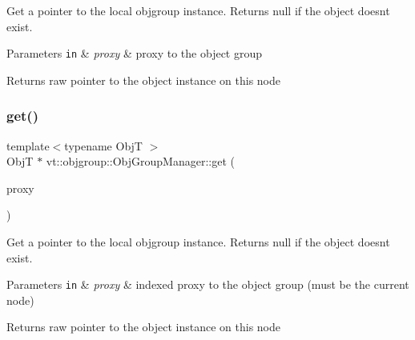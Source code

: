 Get a pointer to the local objgroup instance. Returns null if the object doesn\textquotesingle{}t exist. 


\begin{DoxyParams}[1]{Parameters}
\mbox{\tt in}  & {\em proxy} & proxy to the object group\\
\hline
\end{DoxyParams}
\begin{DoxyReturn}{Returns}
raw pointer to the object instance on this node 
\end{DoxyReturn}
\mbox{\label{structvt_1_1objgroup_1_1_obj_group_manager_a70e5e1d0ada31d6f88a8ec88965df895}} 
\subsubsection{\texorpdfstring{get()}{get()}\hspace{0.1cm}{\footnotesize\ttfamily [2/2]}}
{\footnotesize\ttfamily template$<$typename ObjT $>$ \\
ObjT $\ast$ vt\+::objgroup\+::\+Obj\+Group\+Manager\+::get (\begin{DoxyParamCaption}\item[{\hyperlink{structvt_1_1objgroup_1_1_obj_group_manager_adba6c8ecb0f4c30e719f1abb995cfc9b}{Proxy\+Elm\+Type}$<$ ObjT $>$}]{proxy }\end{DoxyParamCaption})}



Get a pointer to the local objgroup instance. Returns null if the object doesn\textquotesingle{}t exist. 


\begin{DoxyParams}[1]{Parameters}
\mbox{\tt in}  & {\em proxy} & indexed proxy to the object group (must be the current node)\\
\hline
\end{DoxyParams}
\begin{DoxyReturn}{Returns}
raw pointer to the object instance on this node 
\end{DoxyReturn}
\mbox{\label{structvt_1_1objgroup_1_1_obj_group_manager_a9758d68a4656e7ff2eb1ac07b4feeeed}} 
